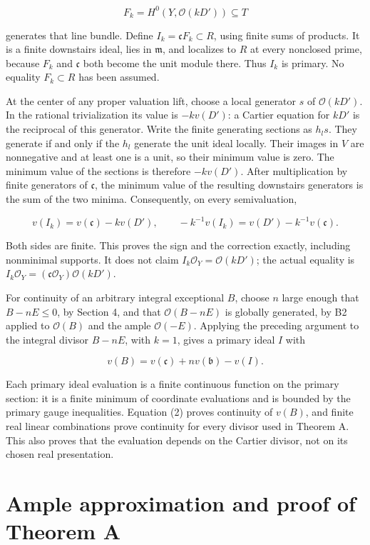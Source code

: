 \documentclass[11pt]{article}
\begin{document}
\[
F_k=H^0(Y,\mathcal O(kD'))\subseteq T
\]

generates that line bundle. Define \(I_k=\mathfrak cF_k\subset R\), using finite sums of products. It is a finite downstairs ideal, lies in \(\mathfrak m\), and localizes to \(R\) at every nonclosed prime, because \(F_k\) and \(\mathfrak c\) both become the unit module there. Thus \(I_k\) is primary. No equality \(F_k\subset R\) has been assumed.

At the center of any proper valuation lift, choose a local generator \(s\) of \(\mathcal O(kD')\). In the rational trivialization its value is \(-k v(D')\): a Cartier equation for \(kD'\) is the reciprocal of this generator. Write the finite generating sections as \(h_ls\). They generate if and only if the \(h_l\) generate the unit ideal locally. Their images in \(V\) are nonnegative and at least one is a unit, so their minimum value is zero. The minimum value of the sections is therefore \(-kv(D')\). After multiplication by finite generators of \(\mathfrak c\), the minimum value of the resulting downstairs generators is the sum of the two minima. Consequently, on every semivaluation,

\[
v(I_k)=v(\mathfrak c)-k v(D'),\qquad
-k^{-1}v(I_k)=v(D')-k^{-1}v(\mathfrak c). \tag{1}
\]

Both sides are finite. This proves the sign and the correction exactly, including nonminimal supports. It does not claim \(I_k\mathcal O_Y=\mathcal O(kD')\); the actual equality is \(I_k\mathcal O_Y=(\mathfrak c\mathcal O_Y)\mathcal O(kD')\).

For continuity of an arbitrary integral exceptional \(B\), choose \(n\) large enough that \(B-nE\leq0\), by Section 4, and that \(\mathcal O(B-nE)\) is globally generated, by B2 applied to \(\mathcal O(B)\) and the ample \(\mathcal O(-E)\). Applying the preceding argument to the integral divisor \(B-nE\), with \(k=1\), gives a primary ideal \(I\) with

\[
v(B)=v(\mathfrak c)+n v(\mathfrak b)-v(I). \tag{2}
\]

Each primary ideal evaluation is a finite continuous function on the primary section: it is a finite minimum of coordinate evaluations and is bounded by the primary gauge inequalities. Equation (2) proves continuity of \(v(B)\), and finite real linear combinations prove continuity for every divisor used in Theorem A. This also proves that the evaluation depends on the Cartier divisor, not on its chosen real presentation.

\section{Ample approximation and proof of Theorem A}
\end{document}
